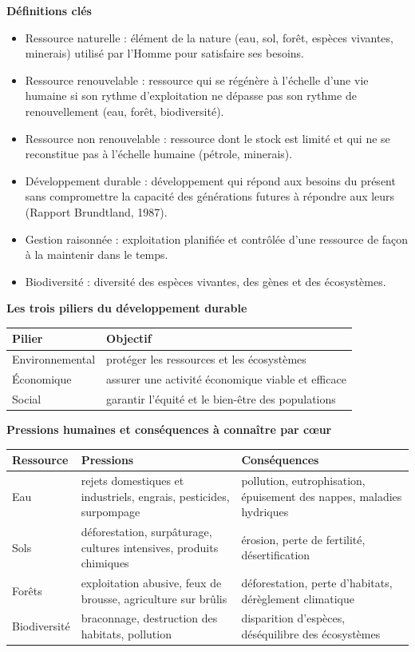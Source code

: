 \documentclass[11pt]{article}
\newcommand{\cle}[1]{{\popxbold\color{popdark}#1}}
\begin{document}
\begin{bilan}
\textbf{Définitions clés}
\begin{itemize}
  \item \cle{Ressource naturelle} : élément de la nature (eau, sol, forêt, espèces vivantes, minerais) utilisé par l'Homme pour satisfaire ses besoins.
  \item \cle{Ressource renouvelable} : ressource qui se régénère à l'échelle d'une vie humaine si son rythme d'exploitation ne dépasse pas son rythme de renouvellement (eau, forêt, biodiversité).
  \item \cle{Ressource non renouvelable} : ressource dont le stock est limité et qui ne se reconstitue pas à l'échelle humaine (pétrole, minerais).
  \item \cle{Développement durable} : développement qui répond aux besoins du présent sans compromettre la capacité des générations futures à répondre aux leurs (Rapport Brundtland, 1987).
  \item \cle{Gestion raisonnée} : exploitation planifiée et contrôlée d'une ressource de façon à la maintenir dans le temps.
  \item \cle{Biodiversité} : diversité des espèces vivantes, des gènes et des écosystèmes.
\end{itemize}

\textbf{Les trois piliers du développement durable}
\begin{center}
\begin{tabularx}{\linewidth}{|l|X|}\hline
\rowcolor{popblueL} \textbf{Pilier} & \textbf{Objectif} \\ \hline
Environnemental & protéger les ressources et les écosystèmes \\ \hline
Économique & assurer une activité économique viable et efficace \\ \hline
Social & garantir l'équité et le bien-être des populations \\ \hline
\end{tabularx}
\end{center}

\textbf{Pressions humaines et conséquences à connaître par cœur}
\begin{center}
\begin{tabularx}{\linewidth}{|l|X|X|}\hline
\rowcolor{popgreenL} \textbf{Ressource} & \textbf{Pressions} & \textbf{Conséquences} \\ \hline
Eau & rejets domestiques et industriels, engrais, pesticides, surpompage & pollution, eutrophisation, épuisement des nappes, maladies hydriques \\ \hline
Sols & déforestation, surpâturage, cultures intensives, produits chimiques & érosion, perte de fertilité, désertification \\ \hline
Forêts & exploitation abusive, feux de brousse, agriculture sur brûlis & déforestation, perte d'habitats, dérèglement climatique \\ \hline
Biodiversité & braconnage, destruction des habitats, pollution & disparition d'espèces, déséquilibre des écosystèmes \\ \hline
\end{tabularx}
\end{center}


\end{bilan}
\end{document}
